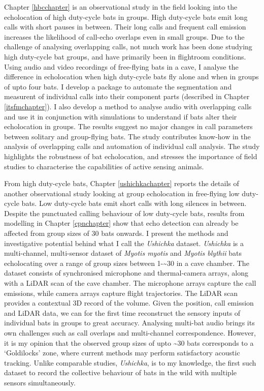 \documentclass[
]{book}
\begin{document}
Chapter \ref{hbcchapter} is an observational study in the field looking into the echolocation of high duty-cycle bats in groups. High duty-cycle bats emit long calls with short pauses in between. Their long calls and frequent call emission increases the likelihood of call-echo overlaps even in small groups. Due to the challenge of analysing overlapping calls, not much work has been done studying high duty-cycle bat groups, and have primarily been in flightroom conditions. Using audio and video recordings of free-flying bats in a cave, I analyse the difference in echolocation when high duty-cycle bats fly alone and when in groups of upto four bats. I develop a package to automate the segmentation and measurent of individual calls into their component parts (described in Chapter \ref{itsfmchapter}). I also develop a method to analyse audio with overlapping calls and use it in conjunction with simulations to understand if bats alter their echolocation in groups. The results suggest no major changes in call parameters between solitary and group-flying bats. The study contributes know-how in the analysis of overlapping calls and automation of individual call analysis. The study highlights the robustness of bat echolocation, and stresses the importance of field studies to characterise the capabilities of active sensing animals.

From high duty-cycle bats, Chapter \ref{ushichkachapter} reports the details of another observational study looking at group echolocation in free-flying low duty-cycle bats. Low duty-cycle bats emit short calls with long silences in between. Despite the punctuated calling behaviour of low duty-cycle bats, results from modelling in Chapter \ref{cpnchapter} show that echo detection can already be affected from group sizes of 30 bats onwards. I present the methods and investigative potential behind what I call the \emph{Ushichka} dataset. \emph{Ushichka} is a multi-channel, multi-sensor dataset of \emph{Myotis myotis} and \emph{Myotis blythii} bats echolocating over a range of group sizes between 1-\textasciitilde30 in a cave chamber. The dataset consists of synchronised microphone and thermal-camera arrays, along with a LiDAR scan of the cave chamber. The microphone arrays capture the call emissions, while camera arrays capture flight trajectories. The LiDAR scan provides a contextual 3D record of the volume. Given the position, call emission and LiDAR data, we can for the first time reconstruct the sensory inputs of individual bats in groups to great accuracy. Analysing multi-bat audio brings its own challenges such as call overlaps and multi-channel correspondence. However, it is my opinion that the observed group sizes of upto \textasciitilde30 bats corresponds to a `Goldilocks' zone, where current methods may perform satisfactory acoustic tracking. Unlike comparable studies, \emph{Ushichka}, is to my knowledge, the first such dataset to record the collective behaviour of bats in the wild with multiple sensors simultaneously.
\end{document}
